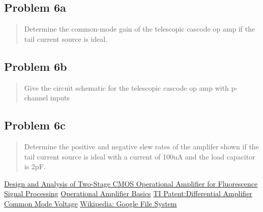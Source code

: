 \documentclass[10pt,a4paper]{article}
\let\oldsubsection\subsection
\renewcommand{\subsection}{%
    \setcounter{equation}{0}%
    \oldsubsection%
}
\begin{document}
\subsection{Problem 6a}
\begin{quote}
Determine the common-mode gain of the telescopic cascode op amp if the tail
current source is ideal.
\end{quote}

\subsection{Problem 6b}
\begin{quote}
Give the circuit schematic for the telescopic cascode op amp with p-channel
inputs
\end{quote}



\subsection{Problem 6c}
\begin{quote}
Determine the positive and negative slew rates of the amplifer shown if the tail
current source is ideal with a current of 100uA and the load capacitor is 2pF.
\end{quote}






\begin{thebibliography}{9}
\href{https://ieeexplore.ieee.org/document/9532225}{Design and Analysis of Two-Stage CMOS Operational Amplifier for Fluorescence Signal Processing}
\href{https://www.electronics-tutorials.ws/opamp/opamp_1.html
}{Operational Amplifier Basics}
\href{https://github.com/Jetsama/EE435/blob/main/HW1/Sources/US20230051462A1.pdf}{TI Patent:Differential Amplifier Common Mode Voltage}
\href{https://en.wikipedia.org/wiki/Google_File_System}{Wikipedia: Google File System}

\end{thebibliography}
\end{document}
